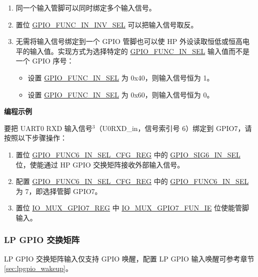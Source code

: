 \documentclass[main\_\_CN.tex]{subfiles}
\begin{document}
\begin{tiplisting}
\vspace{-2em}
\begin{enumerate}
\item \label{input-note-1} 同一个输入管脚可以同时绑定多个输入信号。
\item \label{input-note-2} 置位 \hyperref[fielddesc:GPIOFUNCNININVSEL]{GPIO\_FUNC\_IN\_INV\_SEL} 可以把输入信号取反。
\item \label{input-note-3}无需将输入信号绑定到一个 GPIO 管脚也可以使 HP 外设读取恒低或恒高电平的输入值。实现方式为选择特定的 \hyperref[fielddesc:GPIOFUNCNINSEL]{GPIO\_FUNC\_IN\_SEL} 输入值而不是一个 GPIO 序号：
\begin {itemize}
\item 设置 \hyperref[fielddesc:GPIOFUNCNINSEL]{GPIO\_FUNC\_IN\_SEL} 为 0x40，则输入信号恒为 1。
\item 设置 \hyperref[fielddesc:GPIOFUNCNINSEL]{GPIO\_FUNC\_IN\_SEL} 为 0x60，则输入信号恒为 0。
\end{itemize}
\end{enumerate}
\end{tiplisting}

\textbf{编程示例}

要把 UART0 RXD 输入信号\hyperref[input-note-3]{$^3$}（U0RXD\_in，信号索引号 6）绑定到 GPIO7，请按照以下步骤操作：
\begin{enumerate}
\item 置位 \hyperref[regdesc:GPIOFUNCMINSELCFGREG]{GPIO\_FUNC6\_IN\_SEL\_CFG\_REG} 中的 \hyperref[fielddesc:GPIOSIGNINSEL]{GPIO\_SIG6\_IN\_SEL} 位，使能通过 HP GPIO 交换矩阵接收外部输入信号。
\item 配置 \hyperref[regdesc:GPIOFUNCMINSELCFGREG]{GPIO\_FUNC6\_IN\_SEL\_CFG\_REG} 中的 \hyperref[fielddesc:GPIOFUNCNINSEL]{GPIO\_FUNC6\_IN\_SEL} 为 7，即选择管脚 GPIO7。
\item 置位 \hyperref[regdesc:IOMUXGPIONREG]{IO\_MUX\_GPIO7\_REG} 中 \hyperref[fielddesc:IOMUXGPIONFUNIE]{IO\_MUX\_GPIO7\_FUN\_IE} 位使能管脚输入。
\end{enumerate}

\subsubsection{LP GPIO 交换矩阵}

LP GPIO 交换矩阵输入仅支持 GPIO 唤醒，配置 LP GPIO 输入唤醒可参考章节 \ref{sec:lpgpio_wakeup}。
\end{document}
